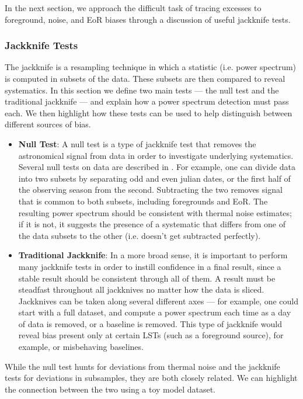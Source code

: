 \documentclass[preprint2,numberedappendix,tighten]{aastex6}  %
\begin{document}
In the next section, we approach the difficult task of tracing excesses to foreground, noise, and EoR biases through a discussion of useful jackknife tests.

\subsubsection{Jackknife Tests}

The jackknife is a resampling technique in which a statistic (i.e. power spectrum) is computed in subsets of the data. These subsets are then compared to reveal systematics. In this section we define two main tests --- the null test and the traditional jackknife --- and explain how a power spectrum detection must pass each. We then highlight how these tests can be used to help distinguish between different sources of bias.
 
\begin{itemize}
\item \textbf{Null Test}: A null test is a type of jackknife test that removes the astronomical signal from data in order to investigate underlying systematics. Several null tests on data are described in \citet{keating_et_al2016}. For example, one can divide data into two subsets by separating odd and even julian dates, or the first half of the observing season from the second. Subtracting the two removes signal that is common to both subsets, including foregrounds and EoR. The resulting power spectrum should be consistent with thermal noise estimates; if it is not, it suggests the presence of a systematic that differs from one of the data subsets to the other (i.e. doesn't get subtracted perfectly). 
\item \textbf{Traditional Jackknife}: In a more broad sense, it is important to perform many jackknife tests in order to instill confidence in a final result, since a stable result should be consistent through all of them. A result must be steadfast throughout all jackknives no matter how the data is sliced. Jackknives can be taken along several different axes --- for example, one could start with a full dataset, and compute a power spectrum each time as a day of data is removed, or a baseline is removed. This type of jackknife would reveal bias present only at certain LSTs (such as a foreground source), for example, or misbehaving baselines.
\end{itemize}

While the null test hunts for deviations from thermal noise and the jackknife tests for deviations in subsamples, they are both closely related. We can highlight the connection between the two using a toy model dataset.
\end{document}
